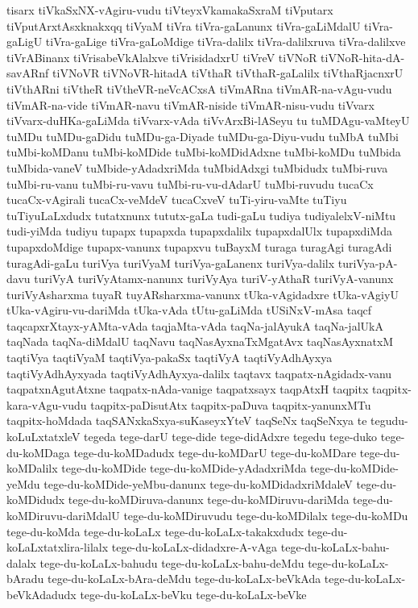 {tisarx
tiVkaSxNX-vAgiru-vudu
tiVteyxVkamakaSxraM
tiVputarx
tiVputArxtAsxknakxqq
tiVyaM
tiVra
tiVra-gaLanunx
tiVra-gaLiMdalU
tiVra-gaLigU
tiVra-gaLige
tiVra-gaLoMdige
tiVra-dalilx
tiVra-dalilxruva
tiVra-dalilxve
tiVrABinanx
tiVrisabeVkAlalxve
tiVrisidadxrU
tiVreV
tiVNoR
tiVNoR-hita-dA-savARnf
tiVNoVR
tiVNoVR-hitadA
tiVthaR
tiVthaR-gaLalilx
tiVthaRjacnxrU
tiVthARni
tiVtheR
tiVtheVR-neVcACxsA
tiVmARna
tiVmAR-na-vAgu-vudu
tiVmAR-na-vide
tiVmAR-navu
tiVmAR-niside
tiVmAR-nisu-vudu
tiVvarx
tiVvarx-duHKa-gaLiMda
tiVvarx-vAda
tiVvArxBi-lASeyu
tu
tuMDAgu-vaMteyU
tuMDu
tuMDu-gaDidu
tuMDu-ga-Diyade
tuMDu-ga-Diyu-vudu
tuMbA
tuMbi
tuMbi-koMDanu
tuMbi-koMDide
tuMbi-koMDidAdxne
tuMbi-koMDu
tuMbida
tuMbida-vaneV
tuMbide-yAdadxriMda
tuMbidAdxgi
tuMbidudx
tuMbi-ruva
tuMbi-ru-vanu
tuMbi-ru-vavu
tuMbi-ru-vu-dAdarU
tuMbi-ruvudu
tucaCx
tucaCx-vAgirali
tucaCx-veMdeV
tucaCxveV
tuTi-yiru-vaMte
tuTiyu
tuTiyuLaLxdudx
tutatxnunx
tututx-gaLa
tudi-gaLu
tudiya
tudiyalelxV-niMtu
tudi-yiMda
tudiyu
tupapx
tupapxda
tupapxdalilx
tupapxdalUlx
tupapxdiMda
tupapxdoMdige
tupapx-vanunx
tupapxvu
tuBayxM
turaga
turagAgi
turagAdi
turagAdi-gaLu
turiVya
turiVyaM
turiVya-gaLanenx
turiVya-dalilx
turiVya-pA-davu
turiVyA
turiVyAtamx-nanunx
turiVyAya
turiV-yAthaR
turiVyA-vanunx
turiVyAsharxma
tuyaR
tuyARsharxma-vanunx
tUka-vAgidadxre
tUka-vAgiyU
tUka-vAgiru-vu-dariMda
tUka-vAda
tUtu-gaLiMda
tUSiNxV-mAsa
taqcf
taqcapxrXtayx-yAMta-vAda
taqjaMta-vAda
taqNa-jalAyukA
taqNa-jalUkA
taqNada
taqNa-diMdalU
taqNavu
taqNasAyxnaTxMgatAvx
taqNasAyxnatxM
taqtiVya
taqtiVyaM
taqtiVya-pakaSx
taqtiVyA
taqtiVyAdhAyxya
taqtiVyAdhAyxyada
taqtiVyAdhAyxya-dalilx
taqtavx
taqpatx-nAgidadx-vanu
taqpatxnAgutAtxne
taqpatx-nAda-vanige
taqpatxsayx
taqpAtxH
taqpitx
taqpitx-kara-vAgu-vudu
taqpitx-paDisutAtx
taqpitx-paDuva
taqpitx-yanunxMTu
taqpitx-hoMdada
taqSANxkaSxya-suKaseyxYteV
taqSeNx
taqSeNxya
te
tegudu-koLuLxtatxleV
tegeda
tege-darU
tege-dide
tege-didAdxre
tegedu
tege-duko
tege-du-koMDaga
tege-du-koMDadudx
tege-du-koMDarU
tege-du-koMDare
tege-du-koMDalilx
tege-du-koMDide
tege-du-koMDide-yAdadxriMda
tege-du-koMDide-yeMdu
tege-du-koMDide-yeMbu-danunx
tege-du-koMDidadxriMdaleV
tege-du-koMDidudx
tege-du-koMDiruva-danunx
tege-du-koMDiruvu-dariMda
tege-du-koMDiruvu-dariMdalU
tege-du-koMDiruvudu
tege-du-koMDilalx
tege-du-koMDu
tege-du-koMda
tege-du-koLaLx
tege-du-koLaLx-takakxdudx
tege-du-koLaLxtatxlira-lilalx
tege-du-koLaLx-didadxre-A-vAga
tege-du-koLaLx-bahu-dalalx
tege-du-koLaLx-bahudu
tege-du-koLaLx-bahu-deMdu
tege-du-koLaLx-bAradu
tege-du-koLaLx-bAra-deMdu
tege-du-koLaLx-beVkAda
tege-du-koLaLx-beVkAdadudx
tege-du-koLaLx-beVku
tege-du-koLaLx-beVke
}
